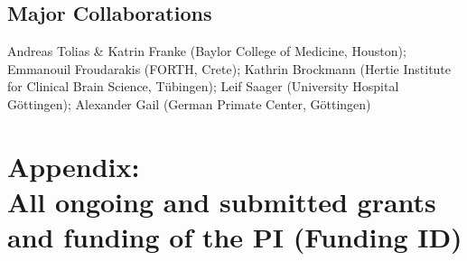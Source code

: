 \documentclass[COG,11pt]{ercgrant}
\begin{document}
\subsection{Major Collaborations}
Andreas Tolias \& Katrin Franke (Baylor College of Medicine, Houston); ‪‪Emmanouil Froudarakis (FORTH, Crete); Kathrin Brockmann (Hertie Institute for Clinical Brain Science, Tübingen); Leif Saager (University Hospital Göttingen); Alexander Gail (German Primate Center, Göttingen) 

\newpage
\section*{Appendix:\\ All ongoing and submitted grants and funding of the PI (Funding ID)}
\end{document}
